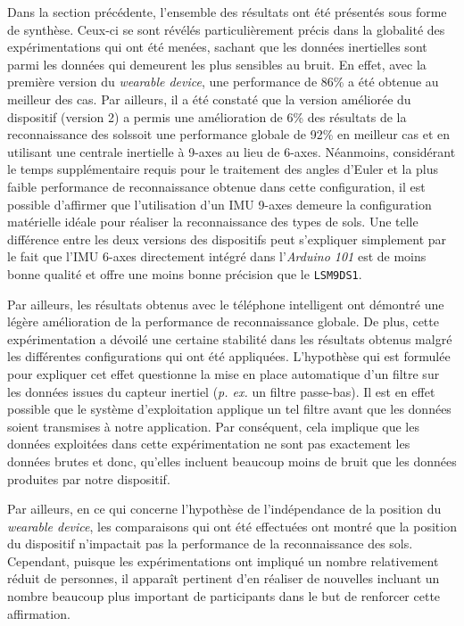 Dans la section précédente, l'ensemble des résultats ont été présentés sous forme de synthèse. Ceux-ci se sont révélés particulièrement précis dans la globalité des expérimentations qui ont été menées, sachant que les données inertielles sont parmi les données qui demeurent les plus sensibles au bruit. En effet, avec la première version du \textit{wearable device}, une performance de 86\% a été obtenue au meilleur des cas. Par ailleurs, il a été constaté que la version améliorée du dispositif (version 2) a permis une amélioration de 6\% des résultats de la reconnaissance des sols\textemdash soit une performance globale de 92\% en meilleur cas et en utilisant une centrale inertielle à 9-axes au lieu de 6-axes. Néanmoins, considérant le temps supplémentaire requis pour le traitement des angles d'Euler et la plus faible performance de reconnaissance obtenue dans cette configuration, il est possible d'affirmer que l'utilisation d'un \acs{IMU} 9-axes demeure la configuration matérielle idéale pour réaliser la reconnaissance des types de sols. Une telle différence entre les deux versions des dispositifs peut s'expliquer simplement par le fait que l'\acs{IMU} 6-axes directement intégré dans l'\textit{Arduino 101} est de moins bonne qualité et offre une moins bonne précision que le \texttt{LSM9DS1}.

Par ailleurs, les résultats obtenus avec le téléphone intelligent ont démontré une légère amélioration de la performance de reconnaissance globale. De plus, cette expérimentation a dévoilé une certaine stabilité dans les résultats obtenus malgré les différentes configurations qui ont été appliquées. L'hypothèse qui est formulée pour expliquer cet effet questionne la mise en place automatique d'un filtre sur les données issues du capteur inertiel (\textit{p. ex.} un filtre passe-bas). Il est en effet possible que le système d'exploitation applique un tel filtre avant que les données soient transmises à notre application. Par conséquent, cela implique que les données exploitées dans cette expérimentation ne sont pas exactement les données brutes et donc, qu'elles incluent beaucoup moins de bruit que les données produites par notre dispositif.

Par ailleurs, en ce qui concerne l'hypothèse de l'indépendance de la position du \textit{wearable device}, les comparaisons qui ont été effectuées ont montré que la position du dispositif n'impactait pas la performance de la reconnaissance des sols. Cependant, puisque les expérimentations ont impliqué un nombre relativement réduit de personnes, il apparaît pertinent d'en réaliser de nouvelles incluant un nombre beaucoup plus important de participants dans le but de renforcer cette affirmation.

